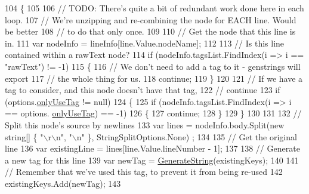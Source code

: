 \begin{DoxyCode}
104                 \{
105 
106                     \textcolor{comment}{// TODO: There's quite a bit of redundant work done here in each loop.}
107                     \textcolor{comment}{// We're unzipping and re-combining the node for EACH line. Would be better}
108                     \textcolor{comment}{// to do that only once.}
109 
110                     \textcolor{comment}{// Get the node that this line is in.}
111                     var nodeInfo = lineInfo[line.Value.nodeName];
112 
113                     \textcolor{comment}{// Is this line contained within a rawText node?}
114                     \textcolor{keywordflow}{if} (nodeInfo.tagsList.FindIndex(i => i == \textcolor{stringliteral}{"rawText"}) != -1)
115                     \{
116                         \textcolor{comment}{// We don't need to add a tag to it - genstrings will export}
117                         \textcolor{comment}{// the whole thing for us.}
118                         \textcolor{keywordflow}{continue};
119                     \}
120 
121                     \textcolor{comment}{// If we have a tag to consider, and this node doesn't have that tag,}
122                     \textcolor{comment}{// continue}
123                     \textcolor{keywordflow}{if} (options.\hyperlink{a00039_ab6162338f9606a836f3101fe0e228249}{onlyUseTag} != null)
124                     \{
125                         \textcolor{keywordflow}{if} (nodeInfo.tagsList.FindIndex(i => i == options.
      \hyperlink{a00039_ab6162338f9606a836f3101fe0e228249}{onlyUseTag}) == -1)
126                         \{
127                             \textcolor{keywordflow}{continue};
128                         \}
129                     \}
130 
131 
132                     \textcolor{comment}{// Split this node's source by newlines}
133                     var lines = nodeInfo.body.Split(\textcolor{keyword}{new} \textcolor{keywordtype}{string}[] \{ \textcolor{stringliteral}{"\(\backslash\)r\(\backslash\)n"}, \textcolor{stringliteral}{"\(\backslash\)n"} \}, StringSplitOptions.None)
      ;
134 
135                     \textcolor{comment}{// Get the original line}
136                     var existingLine = lines[line.Value.lineNumber - 1];
137 
138                     \textcolor{comment}{// Generate a new tag for this line}
139                     var newTag = \hyperlink{a00122_a91ad68b679bd3b0bd89fe92ea5068688}{GenerateString}(existingKeys);
140 
141                     \textcolor{comment}{// Remember that we've used this tag, to prevent it from being re-used}
142                     existingKeys.Add(newTag);
143 

\end{DoxyCode}
